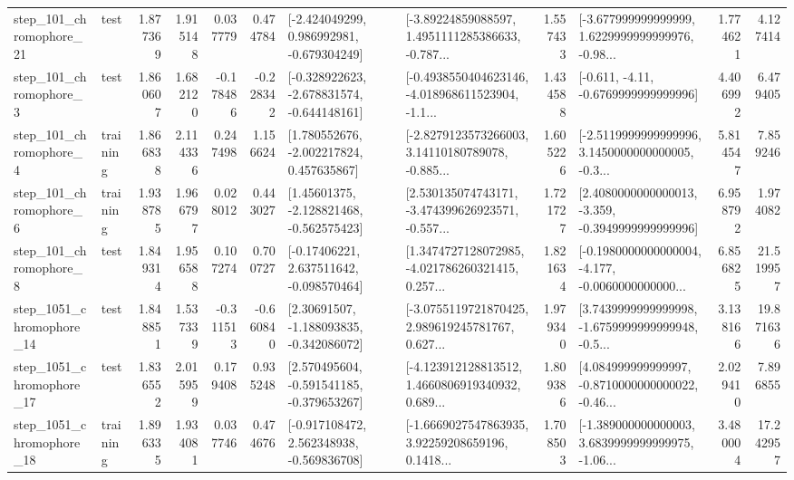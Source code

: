 \begin{tabular}{llrrrrllrlrr}
  step\_101\_chromophore\_21 &      test &      1.877369 &    1.915148 &      0.037779 &  0.474784 &   [-2.424049299, 0.986992981, -0.679304249] &  [-3.89224859088597, 1.4951111285386633, -0.787... &       1.557433 &  [-3.677999999999999, 1.6229999999999976, -0.98... &            1.774621 &          4.127414 \\
   step\_101\_chromophore\_3 &      test &      1.860607 &    1.682120 &     -0.178486 & -0.228342 &  [-0.328922623, -2.678831574, -0.644148161] &  [-0.4938550404623146, -4.018968611523904, -1.1... &       1.434588 &               [-0.611, -4.11, -0.6769999999999996] &            4.406992 &          6.479405 \\
   step\_101\_chromophore\_4 &  training &      1.866838 &    2.114336 &      0.247498 &  1.156624 &    [1.780552676, -2.002217824, 0.457635867] &  [-2.8279123573266003, 3.14110180789078, -0.885... &       1.605226 &  [-2.5119999999999996, 3.1450000000000005, -0.3... &            5.814547 &          7.859246 \\
   step\_101\_chromophore\_6 &  training &      1.938785 &    1.966797 &      0.028012 &  0.443027 &    [1.45601375, -2.128821468, -0.562575423] &  [2.530135074743171, -3.474399626923571, -0.557... &       1.721727 &  [2.4080000000000013, -3.359, -0.3949999999999996] &            6.958792 &          1.974082 \\
   step\_101\_chromophore\_8 &      test &      1.849314 &    1.956588 &      0.107274 &  0.700727 &    [-0.17406221, 2.637511642, -0.098570464] &  [1.3474727128072985, -4.021786260321415, 0.257... &       1.821634 &  [-0.1980000000000004, -4.177, -0.0060000000000... &            6.856825 &         21.519957 \\
 step\_1051\_chromophore\_14 &      test &      1.848851 &    1.537339 &     -0.311513 & -0.660840 &    [2.30691507, -1.188093835, -0.342086072] &  [-3.0755119721870425, 2.989619245781767, 0.627... &       1.979340 &  [3.7439999999999998, -1.6759999999999948, -0.5... &            3.138166 &         19.871636 \\
 step\_1051\_chromophore\_17 &      test &      1.836552 &    2.015959 &      0.179408 &  0.935248 &   [2.570495604, -0.591541185, -0.379653267] &  [-4.123912128813512, 1.4660806919340932, 0.689... &       1.809386 &  [4.084999999999997, -0.8710000000000022, -0.46... &            2.029410 &          7.896855 \\
 step\_1051\_chromophore\_18 &  training &      1.896335 &    1.934081 &      0.037746 &  0.474676 &   [-0.917108472, 2.562348938, -0.569836708] &  [-1.6669027547863935, 3.92259208659196, 0.1418... &       1.708503 &  [-1.389000000000003, 3.6839999999999975, -1.06... &            3.480004 &         17.242957 \\

\end{tabular}
